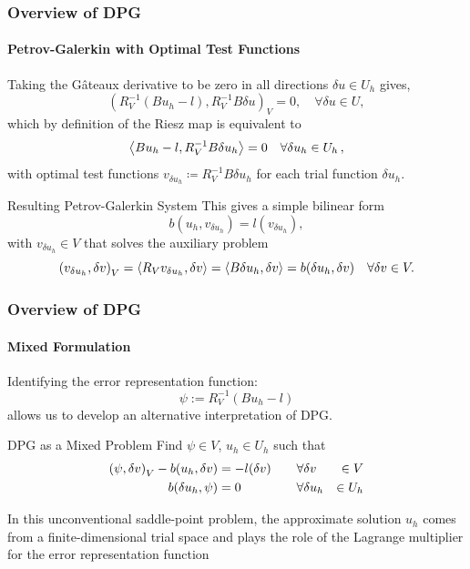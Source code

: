 \documentclass[18pt,xcolor=table]{beamer}
\begin{document}
\begin{frame}[t]
\frametitle{Overview of DPG}
\framesubtitle{Petrov-Galerkin with Optimal Test Functions}
Taking the G\^ateaux derivative to be zero in all directions $\delta u \in
U_h$ gives,
\[
\left(R_V^{-1}(Bu_h-l),R_V^{-1}B\delta u\right)_V = 0, \quad \forall \delta u \in U,
\]
which by definition of the Riesz map is equivalent to 
\begin{equation*}
\left\langle Bu_h-l,R_V^{-1}B\delta u_h \right\rangle=0\quad\forall\delta u_h\in U_h\,,
\end{equation*}
with optimal test functions $v_{\delta u_h}\coloneqq R_V^{-1}B\delta u_h$ for each trial function $\delta u_h$.
\begin{block}{Resulting Petrov-Galerkin System}
This gives a simple bilinear form
\begin{equation*}
b(u_h,v_{\delta u_h})=l(v_{\delta u_h}),
\end{equation*}
with $v_{\delta u_h}\in V$ that solves the auxiliary problem
\begin{equation*}
\left( v_{\delta u_h},\delta v \right)_V=\left\langle R_Vv_{\delta u_h},\delta v \right\rangle
=\left\langle B\delta u_h,\delta v \right\rangle=b(\delta u_h,\delta v)\quad\forall\delta v\in V.
\end{equation*}
\end{block}
\end{frame}

\begin{frame}[t]
\frametitle{Overview of DPG}
\framesubtitle{Mixed Formulation}
Identifying the error representation function:
\[
\psi:=R_V^{-1}(Bu_h-l)
\] 
allows us to develop an alternative interpretation of DPG.
\begin{block}{DPG as a Mixed Problem}
Find $\psi\in V$, $u_h\in U_h$ such that
\begin{equation*}
\begin{aligned}
\left( \psi,\delta v \right)_V-b(u_h,\delta v)&=-l(\delta v) \quad&\forall&\delta v&\in V\\
b(\delta u_h,\psi)&=0 \quad&\forall&\delta u_h&\in U_h
\end{aligned}
\end{equation*}
\end{block}
In this unconventional saddle-point problem, the approximate solution $u_h$ comes from a finite-dimensional
trial space and plays the role of the Lagrange multiplier for the error representation function
\end{frame}
\end{document}
